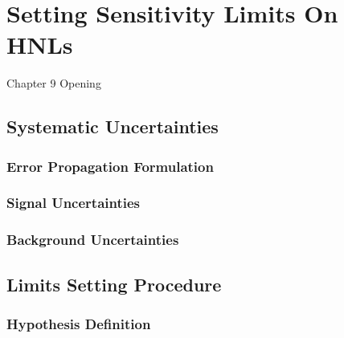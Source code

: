 \chapter{Setting Sensitivity Limits On HNLs}
\label{ChapterResult}

\ifpdf
    \graphicspath{{Chapter9/Figs/Raster/}{Chapter9/Figs/PDF/}{Chapter9/Figs/}}
\else
    \graphicspath{{Chapter9/Figs/Vector/}{Chapter9/Figs/}}
\fi


Chapter 9 Opening

\clearpage
\section{Systematic Uncertainties}

\subsection{Error Propagation Formulation}

\subsection{Signal Uncertainties}

\subsection{Background Uncertainties}


\section{Limits Setting Procedure}

\subsection{Hypothesis Definition}

